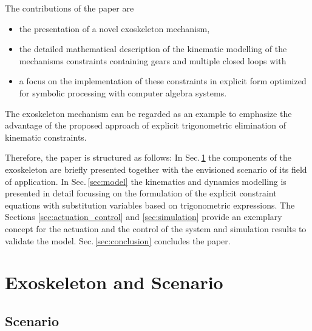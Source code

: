 \documentclass[letterpaper, 10 pt, conference]{ieeeconf}  %
\begin{document}
%
%
%
%
%

The contributions of the paper are
\begin{itemize}
    \item the presentation of a novel exoskeleton mechanism,
    \item the detailed mathematical description of the kinematic modelling of the mechanisms constraints containing gears and multiple closed loops with
    \item a focus on the implementation of these constraints in explicit form optimized for symbolic processing with computer algebra systems.
\end{itemize}

The exoskeleton mechanism can be regarded as an example to emphasize the advantage of the proposed approach of explicit trigonometric elimination of kinematic constraints.

Therefore, the paper is structured as follows:
In Sec.\,\ref{sec:exo_scenario} the components of the exoskeleton are briefly presented together with the envisioned scenario of its field of application. In Sec.\,\ref{sec:model} the kinematics and dynamics modelling is presented in detail focussing on the formulation of the explicit constraint equations with substitution variables based on trigonometric expressions.
The Sections \ref{sec:actuation_control} and
\ref{sec:simulation} provide an exemplary concept for the actuation and the control of the system and simulation results to validate the model. Sec.\,\ref{sec:conclusion} concludes the paper.

\section{Exoskeleton and Scenario}
\label{sec:exo_scenario}
\subsection{Scenario}
\end{document}
